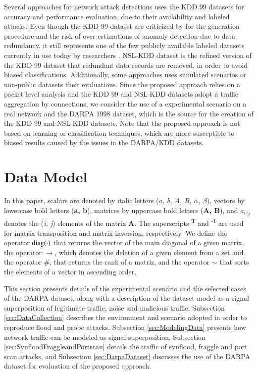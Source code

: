 \documentclass[review]{elsarticle}
\begin{document}
Several approaches for network attack detections uses the KDD 99 \cite{ji2016multi,ahmed2016survey,osanaiye2016distributed,bhuyan2014network} datasets for accuracy and performance evaluation, due to their availability and labeled attacks. Even though the KDD 99 dataset are criticized by for the generation procedure and the risk of over-estimations of anomaly detection due to data redundancy, it still represents one of the few publicly available labeled datasets currently in use today by researchers \cite{osanaiye2016distributed,bhuyan2014network}. NSL-KDD \cite{tavallaee2009detailed} dataset is the refined version of the KDD 99 dataset that redundant data records are removed, in order to avoid biased classifications. Additionally, some approaches uses simulated \cite{callegari2011novel} scenarios or non-public datasets their evaluations. Since the proposed approach relies on a packet level analysis and the KDD 99 and NSL-KDD datasets adopt a traffic aggregation by connections, we consider the use of a experimental scenario on a real network and the DARPA 1998 dataset, which is the source for the creation of the KDD 99 and NSL-KDD datasets. Note that the proposed approach is not based on learning or classification techniques, which are more susceptible to biased results caused by the issues in the DARPA/KDD datasets.


\section{Data Model}
\label{sec:datamodel}

In this paper, scalars are denoted by italic letters (\emph{a, b, A, B, $α$, $β$}), vectors by lowercase bold letters (\textbf{a, b}), matrices by uppercase bold letters (\textbf{A, B}), and $a_i,_j$ denotes the (\emph{i, j}) elements of the matrix \textbf{A}. The superscripts \textsuperscript{T} and \textsuperscript{-1} are used for matrix transposition and matrix inversion, respectively. We define the operator $\rm diag(\cdot)$ that returns the vector of the main diagonal of a given matrix, the operator $\rightarrow$, which denotes the deletion of a given element from a set and the operator $\#$, that returns the rank of a matriz, and the operator $\sim$ that sorts the elements of a vector in ascending order.

This section presents details of the experimental scenario and the selected cases of the DARPA dataset, along with a description of the dataset model as a signal superposition of legitimate traffic, noise and malicious traffic. Subsection \ref{sec:DataCollection} describes the environment and scenario adopted in order to reproduce flood and probe attacks. Subsection \ref{sec:ModelingData} presents how network traffic can be modeled as signal superposition. Subsection \ref{sec:SynfloodFraggleandPortscan} details the traffic of synflood, fraggle and port scan attacks, and Subsection \ref{sec:DarpaDataset} discusses the use of the DARPA dataset for evaluation of the proposed approach.
\end{document}
